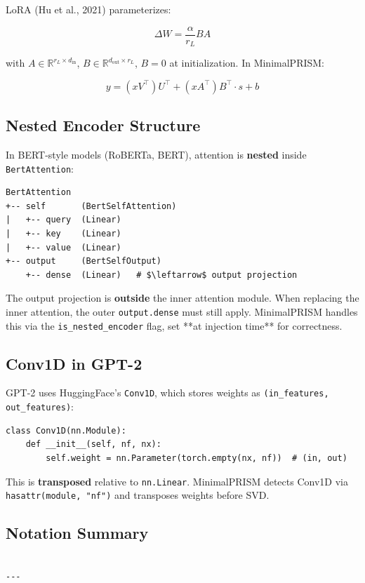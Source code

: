 LoRA (Hu et al., 2021) parameterizes:

\[
\Delta W = \frac{\alpha}{r_L} B A
\tag{3.10}
\]

with $A \in \mathbb{R}^{r_L \times d_\text{in}}$, $B \in \mathbb{R}^{d_\text{out} \times r_L}$, 
$B = 0$ at initialization. In MinimalPRISM:

\[
y = (x V^\top) U^\top + (x A^\top) B^\top \cdot s + b
\tag{3.11}
\]

\subsection{Nested Encoder Structure}

In BERT-style models (RoBERTa, BERT), attention is \textbf{nested} inside 
\texttt{BertAttention}:

\begin{lstlisting}
BertAttention
+-- self       (BertSelfAttention)
|   +-- query  (Linear)
|   +-- key    (Linear)
|   +-- value  (Linear)
+-- output     (BertSelfOutput)
    +-- dense  (Linear)   # $\leftarrow$ output projection
\end{lstlisting}

The output projection is \textbf{outside} the inner attention module. When 
replacing the inner attention, the outer \texttt{output.dense} must still apply. 
MinimalPRISM handles this via the \texttt{is\_nested\_encoder} flag, set **at 
injection time** for correctness.

\subsection{Conv1D in GPT-2}

GPT-2 uses HuggingFace's \texttt{Conv1D}, which stores weights as 
\texttt{(in\_features, out\_features)}:

\begin{lstlisting}
class Conv1D(nn.Module):
    def __init__(self, nf, nx):
        self.weight = nn.Parameter(torch.empty(nx, nf))  # (in, out)
\end{lstlisting}

This is \textbf{transposed} relative to \texttt{nn.Linear}. MinimalPRISM detects 
Conv1D via \texttt{hasattr(module, "nf")} and transposes weights before SVD.

\subsection{Notation Summary}

\begin{lstlisting}

---
\end{lstlisting}